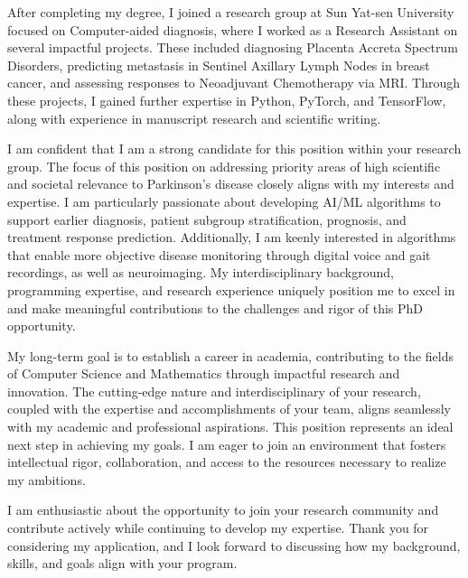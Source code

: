 \documentclass[11pt,a4paper, final]{moderncv}
\newcommand{\spacesubsection}{\vspace{0.2cm}}
\begin{document}
After completing my degree, 
I joined a research group at Sun Yat-sen University focused on Computer-aided diagnosis, 
where I worked as a Research Assistant on several impactful projects. 
These included diagnosing Placenta Accreta Spectrum Disorders, 
predicting metastasis in Sentinel Axillary Lymph Nodes in breast cancer, 
and assessing responses to Neoadjuvant Chemotherapy via MRI. 
Through these projects, I gained further expertise in Python, PyTorch, and TensorFlow, 
along with experience in manuscript research and scientific writing.

I am confident that I am a strong candidate for this position within your research group. 
The focus of this position on addressing priority areas of high scientific and 
societal relevance to Parkinson's disease closely aligns with my interests and expertise. 
I am particularly passionate about developing AI/ML algorithms to support earlier diagnosis, patient subgroup 
stratification, prognosis, and treatment response prediction. 
Additionally, I am keenly interested in algorithms that enable more 
objective disease monitoring through digital voice and gait recordings, as well as neuroimaging. 
My interdisciplinary background, programming expertise, 
and research experience uniquely position me to excel in and make meaningful 
contributions to the challenges and rigor of this PhD opportunity.

My long-term goal is to establish a career in academia, 
contributing to the fields of Computer Science and Mathematics through impactful research and innovation. 
The cutting-edge nature and interdisciplinary of your research, 
coupled with the expertise and accomplishments of your team, 
aligns seamlessly with my academic and professional aspirations. 
This position represents an ideal next step in achieving my goals. 
I am eager to join an environment that fosters intellectual rigor, collaboration, 
and access to the resources necessary to realize my ambitions.

I am enthusiastic about the opportunity to join your research community 
and contribute actively while continuing to develop my expertise. 
Thank you for considering my application, 
and I look forward to discussing how my background, skills, and goals align with your program.


\makeletterclosing
\end{document}
